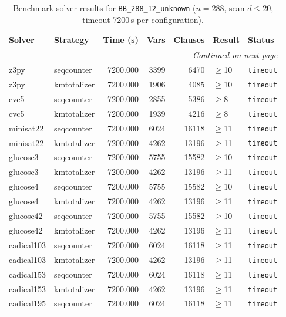 \begin{longtable}{llrrrl p{}}
\caption{Benchmark solver results for \texttt{BB\_288\_12\_unknown} ($n=288$, scan $d \leq 20$, timeout 7200\,s per configuration).} \label{tab:bench-BB_288_12_unknown} \\
\toprule
Solver & Strategy & Time (s) & Vars & Clauses & Result & Status \\
\midrule
\endhead
\midrule
\multicolumn{7}{r}{\textit{Continued on next page}} \\
\midrule
\endfoot
\bottomrule
\endlastfoot
z3py & seqcounter & 7200.000 & 3399 & 6470 & $\geq$10 & \texttt{timeout} \\
z3py & kmtotalizer & 7200.000 & 1906 & 4085 & $\geq$10 & \texttt{timeout} \\
cvc5 & seqcounter & 7200.000 & 2855 & 5386 & $\geq$8 & \texttt{timeout} \\
cvc5 & kmtotalizer & 7200.000 & 1939 & 4216 & $\geq$8 & \texttt{timeout} \\
minisat22 & seqcounter & 7200.000 & 6024 & 16118 & $\geq$11 & \texttt{timeout} \\
minisat22 & kmtotalizer & 7200.000 & 4262 & 13196 & $\geq$11 & \texttt{timeout} \\
glucose3 & seqcounter & 7200.000 & 5755 & 15582 & $\geq$10 & \texttt{timeout} \\
glucose3 & kmtotalizer & 7200.000 & 4262 & 13196 & $\geq$11 & \texttt{timeout} \\
glucose4 & seqcounter & 7200.000 & 5755 & 15582 & $\geq$10 & \texttt{timeout} \\
glucose4 & kmtotalizer & 7200.000 & 4262 & 13196 & $\geq$11 & \texttt{timeout} \\
glucose42 & seqcounter & 7200.000 & 5755 & 15582 & $\geq$10 & \texttt{timeout} \\
glucose42 & kmtotalizer & 7200.000 & 4262 & 13196 & $\geq$11 & \texttt{timeout} \\
cadical103 & seqcounter & 7200.000 & 6024 & 16118 & $\geq$11 & \texttt{timeout} \\
cadical103 & kmtotalizer & 7200.000 & 4262 & 13196 & $\geq$11 & \texttt{timeout} \\
cadical153 & seqcounter & 7200.000 & 6024 & 16118 & $\geq$11 & \texttt{timeout} \\
cadical153 & kmtotalizer & 7200.000 & 4262 & 13196 & $\geq$11 & \texttt{timeout} \\
cadical195 & seqcounter & 7200.000 & 6024 & 16118 & $\geq$11 & \texttt{timeout} \\

\end{longtable}
